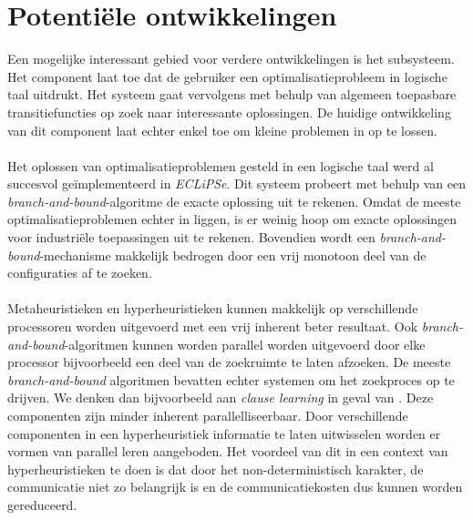 \section{Potenti\"ele ontwikkelingen}

Een mogelijke interessant gebied voor verdere ontwikkelingen is het  subsysteem. Het component laat toe dat de gebruiker een optimalisatieprobleem in logische taal uitdrukt. Het systeem gaat vervolgens met behulp van algemeen toepasbare transitiefuncties op zoek naar interessante oplossingen. De huidige ontwikkeling van dit component laat echter enkel toe om kleine problemen in  op te lossen.

\paragraph{}
Het oplossen van optimalisatieproblemen gesteld in een logische taal werd al succesvol ge\"implementeerd in \emph{ECLiPSe}. Dit systeem probeert met behulp van een \emph{branch-and-bound}-algoritme de exacte oplossing uit te rekenen. Omdat de meeste optimalisatieproblemen echter in  liggen, is er weinig hoop om exacte oplossingen voor industri\"ele toepassingen uit te rekenen. Bovendien wordt een \emph{branch-and-bound}-mechanisme makkelijk bedrogen door een vrij monotoon deel van de configuraties af te zoeken.

\paragraph{}
Metaheuristieken en hyperheuristieken kunnen makkelijk op verschillende processoren worden uitgevoerd met een vrij inherent beter resultaat. Ook \emph{branch-and-bound}-algoritmen kunnen worden parallel worden uitgevoerd door elke processor bijvoorbeeld een deel van de zoekruimte te laten afzoeken. De meeste \emph{branch-and-bound} algoritmen bevatten echter systemen om het zoekproces op te drijven. We denken dan bijvoorbeeld aan \emph{clause learning} in geval van . Deze componenten zijn minder inherent parallelliseerbaar. Door verschillende componenten in een hyperheuristiek informatie te laten uitwisselen worden er vormen van parallel leren aangeboden. Het voordeel van dit in een context van hyperheuristieken te doen is dat door het non-deterministisch  karakter, de communicatie niet zo belangrijk is en de communicatiekosten dus kunnen worden gereduceerd.


